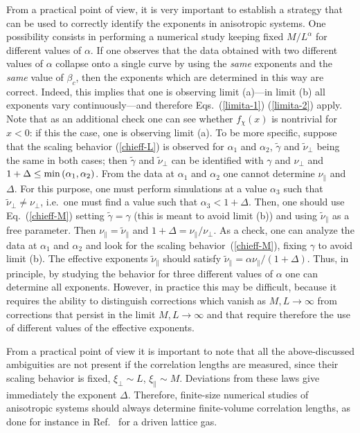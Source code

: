 \documentclass[a4paper,12pt]{article}
\begin{document}
From a practical point of view, it is very important to 
establish a strategy that can be used to correctly identify the exponents
in anisotropic systems.  One possibility consists 
in performing a numerical study keeping 
fixed $M/L^\alpha$ for different values of $\alpha$. If one 
observes that the data obtained with two different values of $\alpha$
collapse onto a single curve by using the {\em same} exponents and the 
{\em same} value of $\beta_c$, then the exponents 
which are determined in this way are correct. Indeed, this implies 
that one is observing limit (a)---in limit (b) all exponents vary 
continuously---and therefore Eqs.~(\ref{limita-1}) (\ref{limita-2}) apply.
Note that as an additional check one can see whether $f_\chi(x)$ is 
nontrivial for $x < 0$: if this the case, one is observing limit (a).
To be more specific, suppose that the 
scaling behavior (\ref{chieff-L}) is observed for $\alpha_1 $ and $\alpha_2$, 
$\tilde{\gamma}$ and $\tilde{\nu}_\bot$ being the same in both cases;
then $\tilde{\gamma}$ and $\tilde{\nu}_\bot$ can be identified with 
$\gamma$ and $\nu_\bot$ and $1 + \Delta \le {\rm min}\, (\alpha_1,\alpha_2)$. 
From the data at $\alpha_1 $ and $\alpha_2$ 
one cannot determine $\nu_\|$ and $\Delta$. For this 
purpose, one must perform simulations at a value $\alpha_3$ such that 
$\tilde{\nu}_\bot\not= \nu_\bot$, i.e.~one must find a value such 
that $\alpha_3 < 1 + \Delta$. Then, one should use Eq.~(\ref{chieff-M}) 
setting $\tilde{\gamma} = \gamma$ (this is meant to avoid limit (b))
and using $\tilde{\nu}_\|$ as a free parameter. Then $\nu_\| = \tilde{\nu}_\|$ 
and $1 + \Delta = \nu_\|/\nu_\bot$. As a check, one can analyze 
the data at $\alpha_1$ and $\alpha_2$ and look for the scaling
behavior~(\ref{chieff-M}), fixing $\gamma$ to avoid limit (b). 
The effective exponents $\tilde{\nu}_\|$ should satisfy 
$\tilde{\nu}_\| = \alpha {\nu}_\| /(1 + \Delta)$.
Thus, in principle, by studying the behavior for three different values 
of $\alpha$ one can determine all exponents. However, in practice 
this may be difficult, because it requires the ability to distinguish 
corrections which vanish as $M,L\to \infty$ from corrections
that persist in the limit $M,L\to \infty$ and that require therefore 
the use of different values of the effective exponents. 

From a practical point of view it is important to note that all the 
above-discussed ambiguities are not present if the correlation lengths
are measured, since their scaling behavior is fixed, 
$\xi_\bot \sim L$, $\xi_\| \sim M$. Deviations from these laws give immediately
the exponent $\Delta$. Therefore, finite-size 
numerical studies of anisotropic systems 
should always determine finite-volume correlation lengths, as done 
for instance in Ref.~\cite{CGGP-02} for a driven lattice gas. 
\end{document}
